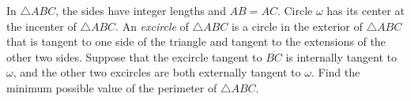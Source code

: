 In $\triangle{ABC}$, the sides have integer lengths and $AB=AC$. Circle $\omega$ has its center at the incenter of $\triangle{ABC}$. An \emph{excircle} of $\triangle{ABC}$ is a circle in the exterior of $\triangle{ABC}$ that is tangent to one side of the triangle and tangent to the extensions of the other two sides. Suppose that the excircle tangent to $\overline{BC}$ is internally tangent to $\omega$, and the other two excircles are both externally tangent to $\omega$. Find the minimum possible value of the perimeter of $\triangle{ABC}$.